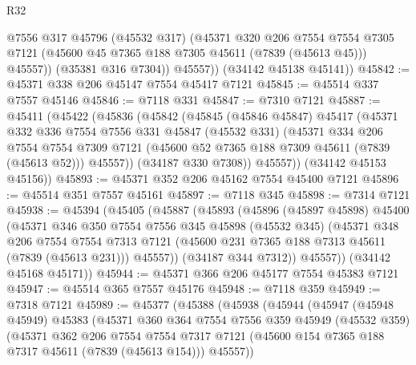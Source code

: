 \begin{lexlean}{R32}
\begin{coremodule}
              @7556
              @317
              @45796
              (@45532 @317)
              (@45371
                @320
                @206
                @7554
                @7554
                @7305
                @7121
                (@45600 @45 @7365 @188 @7305 @45611 (@7839 (@45613 @45)))
                @45557))
            (@35381 @316 @7304))
          @45557))
      (@34142 @45138 @45141))
@45842 := @45371 @338 @206 @45147 @7554 @45417 @7121
@45845 := @45514 @337 @7557 @45146
@45846 := @7118 @331
@45847 := @7310 @7121
@45887 := @45411
    (@45422
      (@45836
        (@45842
          (@45845
            (@45846 @45847)
            @45417
            (@45371
              @332
              @336
              @7554
              @7556
              @331
              @45847
              (@45532 @331)
              (@45371
                @334
                @206
                @7554
                @7554
                @7309
                @7121
                (@45600 @52 @7365 @188 @7309 @45611 (@7839 (@45613 @52)))
                @45557))
            (@34187 @330 @7308))
          @45557))
      (@34142 @45153 @45156))
@45893 := @45371 @352 @206 @45162 @7554 @45400 @7121
@45896 := @45514 @351 @7557 @45161
@45897 := @7118 @345
@45898 := @7314 @7121
@45938 := @45394
    (@45405
      (@45887
        (@45893
          (@45896
            (@45897 @45898)
            @45400
            (@45371
              @346
              @350
              @7554
              @7556
              @345
              @45898
              (@45532 @345)
              (@45371
                @348
                @206
                @7554
                @7554
                @7313
                @7121
                (@45600 @231 @7365 @188 @7313 @45611 (@7839 (@45613 @231)))
                @45557))
            (@34187 @344 @7312))
          @45557))
      (@34142 @45168 @45171))
@45944 := @45371 @366 @206 @45177 @7554 @45383 @7121
@45947 := @45514 @365 @7557 @45176
@45948 := @7118 @359
@45949 := @7318 @7121
@45989 := @45377
    (@45388
      (@45938
        (@45944
          (@45947
            (@45948 @45949)
            @45383
            (@45371
              @360
              @364
              @7554
              @7556
              @359
              @45949
              (@45532 @359)
              (@45371
                @362
                @206
                @7554
                @7554
                @7317
                @7121
                (@45600 @154 @7365 @188 @7317 @45611 (@7839 (@45613 @154)))
                @45557))

\end{coremodule}
\end{lexlean}
